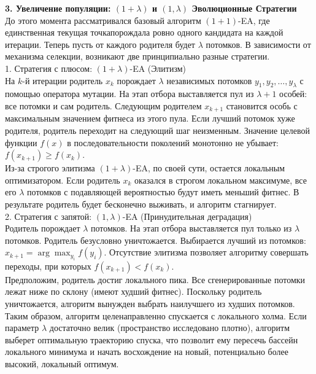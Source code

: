 \textbf{3. Увеличение популяции: $(1+\lambda)$ и $(1,\lambda)$ Эволюционные Стратегии} \\
До этого момента рассматривался базовый алгоритм $(1+1)$-EA, где единственная текущая точкапорождала ровно одного кандидата на каждой итерации. Теперь пусть от каждого родителя будет $\lambda$ потомков. В зависимости от механизма селекции, возникают две принципиально разные стратегии. \\
1. Стратегия с плюсом: $(1 + \lambda)$-EA (Элитизм) \\
На $k$-й итерации родитель $x_k$ порождает $\lambda$ независимых потомков $y_1, y_2, \dots, y_\lambda$ с помощью оператора мутации. На этап отбора выставляется пул из $\lambda + 1$ особей: все потомки и сам родитель. Следующим родителем $x_{k+1}$ становится особь с максимальным значением фитнеса из этого пула. Если лучший потомок хуже родителя, родитель переходит на следующий шаг неизменным. Значение целевой функции $f(x)$ в последовательности поколений монотонно не убывает: $f(x_{k+1}) \ge f(x_k)$. \\
Из-за строгого элитизма $(1 + \lambda)$-EA, по своей сути, остается локальным оптимизатором. Если родитель $x_k$ оказался в строгом локальном максимуме, все его $\lambda$ потомков с подавляющей вероятностью будут иметь меньший фитнес. В результате родитель будет бесконечно выживать, и алгоритм стагнирует. \\
2. Стратегия с запятой: $(1, \lambda)$-EA (Принудительная деградация) \\
Родитель порождает $\lambda$ потомков. На этап отбора выставляется пул только из $\lambda$ потомков. Родитель безусловно уничтожается. Выбирается лучший из потомков: $x_{k+1} = \arg\max_{y_i} f(y_i)$.
Отсутствие элитизма позволяет алгоритму совершать переходы, при которых $f(x_{k+1}) < f(x_k)$. \\
Предположим, родитель достиг локального пика. Все сгенерированные потомки лежат ниже по склону (имеют худший фитнес). Поскольку родитель уничтожается, алгоритм вынужден выбрать наилучшего из худших потомков. Таким образом, алгоритм целенаправленно спускается с локального холма. Если параметр $\lambda$ достаточно велик (пространство исследовано плотно), алгоритм выберет оптимальную траекторию спуска, что позволит ему пересечь бассейн локального минимума и начать восхождение на новый, потенциально более высокий, локальный оптимум.



